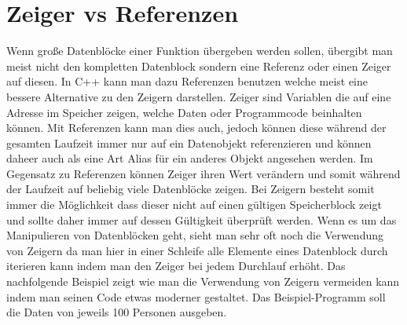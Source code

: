 \documentclass[MES,Master,ngerman]{twbook}%
\begin{document}
\section{Zeiger vs Referenzen}
Wenn große Datenblöcke einer Funktion übergeben werden sollen, übergibt man meist nicht den kompletten Datenblock sondern eine Referenz oder einen Zeiger auf diesen. In C++ kann man dazu Referenzen benutzen welche meist eine bessere Alternative zu den Zeigern darstellen. Zeiger sind Variablen die auf eine Adresse im Speicher zeigen, welche Daten oder Programmcode beinhalten können. Mit Referenzen kann man dies auch, jedoch können diese während der gesamten Laufzeit immer nur auf ein Datenobjekt referenzieren und können daheer auch als eine Art Alias für ein anderes Objekt angesehen werden. Im Gegensatz zu Referenzen können Zeiger ihren Wert verändern und somit während der Laufzeit auf beliebig viele Datenblöcke zeigen. Bei Zeigern besteht somit immer die Möglichkeit dass dieser nicht auf einen gültigen Speicherblock zeigt und sollte daher immer auf dessen Gültigkeit überprüft werden. \newline \newline
Wenn es um das Manipulieren von Datenblöcken geht, sieht man sehr oft noch die Verwendung von Zeigern da man hier in einer Schleife alle Elemente eines Datenblock durch iterieren kann indem man den Zeiger bei jedem Durchlauf erhöht. Das nachfolgende Beispiel zeigt wie man die Verwendung von Zeigern vermeiden kann indem man seinen Code etwas moderner gestaltet. Das Beispiel-Programm soll die Daten von jeweils 100 Personen ausgeben.\newline

\begin{figure}[!htb]
	\begin{subfigure}[b]{0.5\textwidth}
		
		\label{fig:13}
	\end{subfigure}
	\begin{subfigure}[b]{0.5\textwidth}
		
		\label{fig:14}
	\end{subfigure}
\end{figure}
\end{document}

